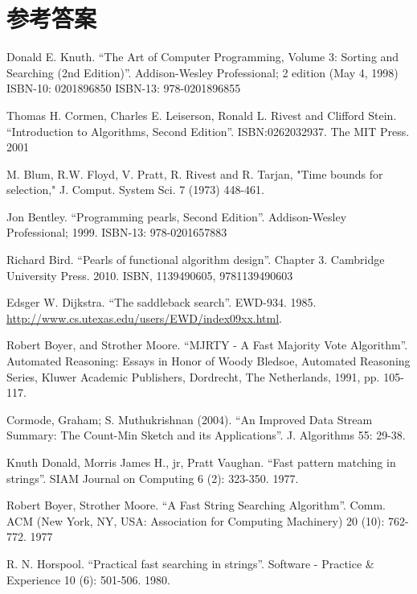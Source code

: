 \documentclass[b5paper]{ctexart}
\begin{document}
\ifx\wholebook\relax\else
\section{参考答案}
\shipoutAnswer

\begin{thebibliography}{99}

Donald E. Knuth. ``The Art of Computer Programming, Volume 3: Sorting and Searching (2nd Edition)''. Addison-Wesley Professional; 2 edition (May 4, 1998) ISBN-10: 0201896850 ISBN-13: 978-0201896855

Thomas H. Cormen, Charles E. Leiserson, Ronald L. Rivest and Clifford Stein.
``Introduction to Algorithms, Second Edition''. ISBN:0262032937. The MIT Press. 2001

M. Blum, R.W. Floyd, V. Pratt, R. Rivest and R. Tarjan, "Time bounds for selection," J. Comput. System Sci. 7 (1973) 448-461.

Jon Bentley. ``Programming pearls, Second Edition''. Addison-Wesley Professional; 1999. ISBN-13: 978-0201657883

Richard Bird. ``Pearls of functional algorithm design''. Chapter 3. Cambridge University Press. 2010. ISBN, 1139490605, 9781139490603

Edsger W. Dijkstra. ``The saddleback search''. EWD-934. 1985. \url{http://www.cs.utexas.edu/users/EWD/index09xx.html}.

Robert Boyer, and Strother Moore. ``MJRTY - A Fast Majority Vote Algorithm''. Automated Reasoning: Essays in Honor of Woody Bledsoe, Automated Reasoning Series, Kluwer Academic Publishers, Dordrecht, The Netherlands, 1991, pp. 105-117.

Cormode, Graham; S. Muthukrishnan (2004). ``An Improved Data Stream Summary: The Count-Min Sketch and its Applications''. J. Algorithms 55: 29-38.

Knuth Donald, Morris James H., jr, Pratt Vaughan. ``Fast pattern matching in strings''. SIAM Journal on Computing 6 (2): 323-350. 1977.

Robert Boyer, Strother Moore. ``A Fast String Searching Algorithm''. Comm. ACM (New York, NY, USA: Association for Computing Machinery) 20 (10): 762-772. 1977

R. N. Horspool. ``Practical fast searching in strings''. Software - Practice \& Experience 10 (6): 501-506. 1980.


\end{thebibliography}
\end{document}
